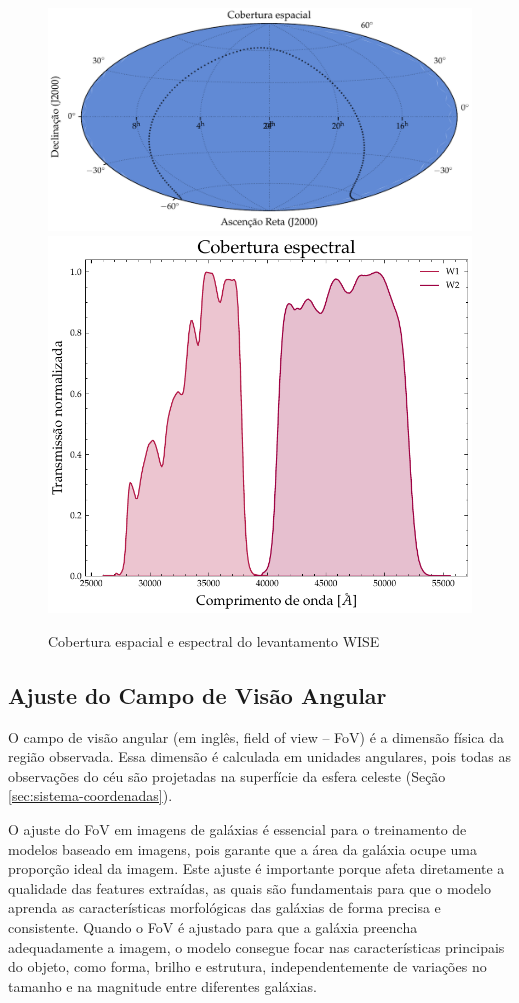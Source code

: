 \begin{figure}[!ht]
  \centering
  \caption{Cobertura espacial e espectral do levantamento WISE}
  \label{fig:footprint-unwise}
  \includegraphics[width=0.61\linewidth]{figures/footprint_unwise.pdf}\hfill
  \includegraphics[width=0.37\linewidth]{figures/transmission_unwise.pdf}
\end{figure}




\subsection{Ajuste do Campo de Visão Angular}
\label{sec:aquisicao-fov}

O campo de visão angular (em inglês, field of view -- FoV) é a dimensão física da região observada. Essa dimensão é calculada em unidades angulares, pois todas as observações do céu são projetadas na superfície da esfera celeste (Seção \ref{sec:sistema-coordenadas}).

O ajuste do FoV em imagens de galáxias é essencial para o treinamento de modelos baseado em imagens, pois garante que a área da galáxia ocupe uma proporção ideal da imagem. Este ajuste é importante porque afeta diretamente a qualidade das features extraídas, as quais são fundamentais para que o modelo aprenda as características morfológicas das galáxias de forma precisa e consistente. Quando o FoV é ajustado para que a galáxia preencha adequadamente a imagem, o modelo consegue focar nas características principais do objeto, como forma, brilho e estrutura, independentemente de variações no tamanho e na magnitude entre diferentes galáxias.

